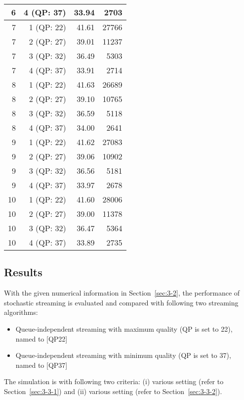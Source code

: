 \documentclass[conference]{IEEEtran}
\begin{document}
\begin{table}[t!]
{\begin{tabular}{r|r||r|r}
    6        & 4 (QP: 37) & 33.94	 & 2703 \\
	\midrule
    7        & 1 (QP: 22) & 41.61	 & 27766 \\
    7        & 2 (QP: 27) & 39.01	 & 11237 \\
    7        & 3 (QP: 32) & 36.49	 & 5303 \\
    7        & 4 (QP: 37) & 33.91	 & 2714 \\
	\midrule
    8        & 1 (QP: 22) & 41.63	 & 26689 \\
    8        & 2 (QP: 27) & 39.10	 & 10765 \\
    8        & 3 (QP: 32) & 36.59	 & 5118 \\
    8        & 4 (QP: 37) & 34.00	 & 2641 \\
	\midrule
    9        & 1 (QP: 22) & 41.62	 & 27083 \\
    9        & 2 (QP: 27) & 39.06	 & 10902 \\
    9        & 3 (QP: 32) & 36.56	 & 5181 \\
    9        & 4 (QP: 37) & 33.97	 & 2678 \\
	\midrule
    10       & 1 (QP: 22) & 41.60	 & 28006 \\
    10       & 2 (QP: 27) & 39.00	 & 11378 \\
    10       & 3 (QP: 32) & 36.47	 & 5364 \\
    10       & 4 (QP: 37) & 33.89	 & 2735 \\
	\bottomrule[1.0pt]
	\end{tabular}
}
\end{table}

\subsection{Results}

With the given numerical information in Section~\ref{sec:3-2}, the performance of stochastic streaming is evaluated and compared with following two streaming algorithms:
\begin{itemize}
\item Queue-independent streaming with maximum quality (QP is set to 22), named to \textsf{[QP22]}
\item Queue-independent streaming with minimum quality (QP is set to 37), named to \textsf{[QP37]}
\end{itemize}

The simulation is with following two criteria: (i) various  setting (refer to Section~\ref{sec:3-3-1}) and (ii) various  setting (refer to Section~\ref{sec:3-3-2}).
\end{document}
